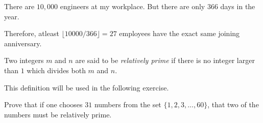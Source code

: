 \begin{solution}
	There are $10,000$ engineers at my workplace. But there are only $366$ days in the year. 

	Therefore, atleast $\lfloor 10000/366 \rfloor = 27$ employees have the exact same joining anniversary.
\end{solution}

\begin{named}[Definition]
	Two integers $m$ and $n$ are said to be \emph{relatively prime} if there is no integer larger than $1$ which divides both $m$ and $n$.
\end{named}

This definition will be used in the following exercise.

\begin{problem}
Prove that if one chooses $31$ numbers from the set $\{1,2,3,...,60\}$, that two of the numbers must be relatively prime.
\end{problem}
